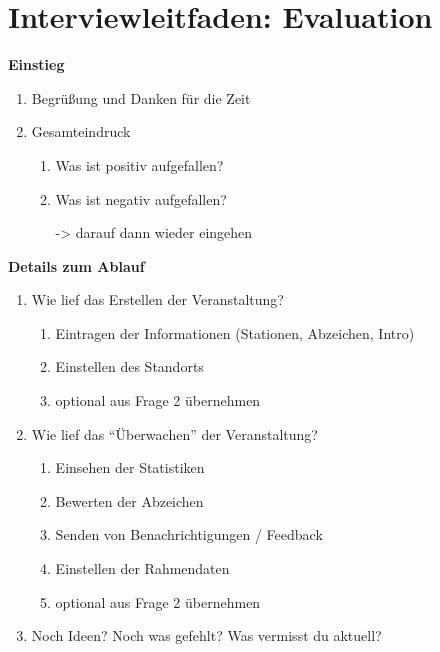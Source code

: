 \chapter{Interviewleitfaden: Evaluation} \label{appendix:evaluation}

\textbf{\large Einstieg}

\begin{enumerate}[noitemsep,topsep=0pt]
    \item Begrüßung und Danken für die Zeit
    \item
        Gesamteindruck
        \begin{enumerate}[noitemsep,topsep=0pt]
            \item Was ist positiv aufgefallen?
            \item Was ist negativ aufgefallen?
        \end{enumerate}
        \begin{itemize}[noitemsep,topsep=0pt]
            \item[->] darauf dann wieder eingehen
        \end{itemize}
\end{enumerate}

\textbf{\large Details zum Ablauf }

\begin{enumerate}[noitemsep,topsep=0pt]
    \item  Wie lief das Erstellen der Veranstaltung?
    \begin{enumerate}[noitemsep,topsep=0pt]
        \item Eintragen der Informationen (Stationen, Abzeichen, Intro)
        \item Einstellen des Standorts
        \item optional aus Frage 2 übernehmen
    \end{enumerate}
    \item Wie lief das “Überwachen” der Veranstaltung?
    \begin{enumerate}[noitemsep,topsep=0pt]
              \item Einsehen der Statistiken
              \item Bewerten der Abzeichen
              \item Senden von Benachrichtigungen / Feedback
              \item Einstellen der Rahmendaten
              \item optional aus Frage 2 übernehmen
    \end{enumerate}
    \item Noch Ideen? Noch was gefehlt? Was vermisst du aktuell?
\end{enumerate}


